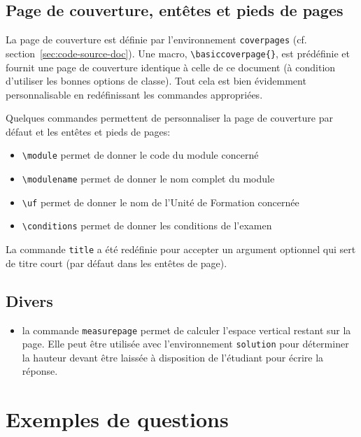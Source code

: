 \documentclass[addpoints,fr,biblatex,name,gradetable,marksdetail,markssum]{isae-exam}
\begin{document}
\subsection{Page de couverture, entêtes et pieds de pages}
\label{sec:page-de-couverture}

La page de couverture est définie par l'environnement
\lstinline!coverpages! (cf. section~\ref{sec:code-source-doc}). Une
macro, \lstinline!\basiccoverpage{}!, est prédéfinie et fournit une
page de couverture identique à celle de ce document (à condition
d'utiliser les bonnes options de classe). Tout cela est bien
évidemment personnalisable en redéfinissant les commandes appropriées.

Quelques commandes permettent de personnaliser la page de couverture
par défaut et les entêtes et pieds de pages:

\begin{itemize}
\item \lstinline!\module! permet de donner le code du module concerné
\item \lstinline!\modulename! permet de donner le nom complet du module
\item \lstinline!\uf! permet de donner le nom de l'Unité de Formation
  concernée
\item \lstinline!\conditions! permet de donner les conditions de
  l'examen
\end{itemize}

La commande \lstinline!title! a été redéfinie pour accepter un
argument optionnel qui sert de titre court (par défaut dans les
entêtes de page).

\subsection{Divers}
\label{sec:divers}

\begin{itemize}
\item la commande \lstinline!measurepage! permet de calculer l'espace
  vertical restant sur la page. Elle peut être utilisée avec
  l'environnement \lstinline!solution! pour déterminer la hauteur
  devant être laissée à disposition de l'étudiant pour écrire la
  réponse.
\end{itemize}

\section{Exemples de questions}
\label{sec:exemples-questions}
\end{document}
